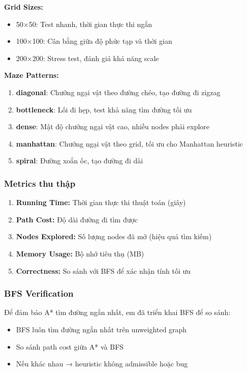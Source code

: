 \documentclass[12pt,a4paper]{article}
\begin{document}
\textbf{Grid Sizes:}
\begin{itemize}
    \item 50×50: Test nhanh, thời gian thực thi ngắn
    \item 100×100: Cân bằng giữa độ phức tạp và thời gian
    \item 200×200: Stress test, đánh giá khả năng scale
\end{itemize}

\textbf{Maze Patterns:}
\begin{enumerate}
    \item \textbf{diagonal}: Chướng ngại vật theo đường chéo, tạo đường đi zigzag
    \item \textbf{bottleneck}: Lối đi hẹp, test khả năng tìm đường tối ưu
    \item \textbf{dense}: Mật độ chướng ngại vật cao, nhiều nodes phải explore
    \item \textbf{manhattan}: Chướng ngại vật theo grid, tối ưu cho Manhattan heuristic
    \item \textbf{spiral}: Đường xoắn ốc, tạo đường đi dài
\end{enumerate}

\subsubsection{Metrics thu thập}
\begin{enumerate}
    \item \textbf{Running Time:} Thời gian thực thi thuật toán (giây)
    \item \textbf{Path Cost:} Độ dài đường đi tìm được
    \item \textbf{Nodes Explored:} Số lượng nodes đã mở (hiệu quả tìm kiếm)
    \item \textbf{Memory Usage:} Bộ nhớ tiêu thụ (MB)
    \item \textbf{Correctness:} So sánh với BFS để xác nhận tính tối ưu
\end{enumerate}

\subsubsection{BFS Verification}
Để đảm bảo A* tìm đường ngắn nhất, em đã triển khai BFS để so sánh:
\begin{itemize}
    \item BFS luôn tìm đường ngắn nhất trên unweighted graph
    \item So sánh path cost giữa A* và BFS
    \item Nếu khác nhau → heuristic không admissible hoặc bug
\end{itemize}
\end{document}
